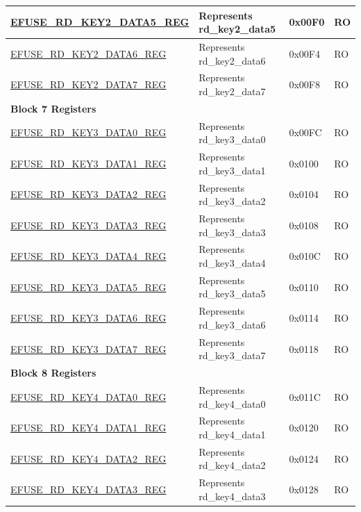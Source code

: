 \begin{longtable}{ | p{7cm} | p{6cm} | p{1.2cm} | p{1.5cm} | }
\hyperref[regdesc:EFUSERDKEY2DATANREG]{EFUSE\_RD\_KEY2\_DATA5\_REG} & Represents rd\_key2\_data5 & 0x00F0 & RO \\ \hline
\hyperref[regdesc:EFUSERDKEY2DATANREG]{EFUSE\_RD\_KEY2\_DATA6\_REG} & Represents rd\_key2\_data6 & 0x00F4 & RO \\ \hline
\hyperref[regdesc:EFUSERDKEY2DATANREG]{EFUSE\_RD\_KEY2\_DATA7\_REG} & Represents rd\_key2\_data7 & 0x00F8 & RO \\ \hline
\multicolumn{4}{|l|}{\textbf{Block 7 Registers}} \\ \hline
\hyperref[regdesc:EFUSERDKEY3DATANREG]{EFUSE\_RD\_KEY3\_DATA0\_REG} & Represents rd\_key3\_data0 & 0x00FC & RO \\ \hline
\hyperref[regdesc:EFUSERDKEY3DATANREG]{EFUSE\_RD\_KEY3\_DATA1\_REG} & Represents rd\_key3\_data1 & 0x0100 & RO \\ \hline
\hyperref[regdesc:EFUSERDKEY3DATANREG]{EFUSE\_RD\_KEY3\_DATA2\_REG} & Represents rd\_key3\_data2 & 0x0104 & RO \\ \hline
\hyperref[regdesc:EFUSERDKEY3DATANREG]{EFUSE\_RD\_KEY3\_DATA3\_REG} & Represents rd\_key3\_data3 & 0x0108 & RO \\ \hline
\hyperref[regdesc:EFUSERDKEY3DATANREG]{EFUSE\_RD\_KEY3\_DATA4\_REG} & Represents rd\_key3\_data4 & 0x010C & RO \\ \hline
\hyperref[regdesc:EFUSERDKEY3DATANREG]{EFUSE\_RD\_KEY3\_DATA5\_REG} & Represents rd\_key3\_data5 & 0x0110 & RO \\ \hline
\hyperref[regdesc:EFUSERDKEY3DATANREG]{EFUSE\_RD\_KEY3\_DATA6\_REG} & Represents rd\_key3\_data6 & 0x0114 & RO \\ \hline
\hyperref[regdesc:EFUSERDKEY3DATANREG]{EFUSE\_RD\_KEY3\_DATA7\_REG} & Represents rd\_key3\_data7 & 0x0118 & RO \\ \hline
\multicolumn{4}{|l|}{\textbf{Block 8 Registers}} \\ \hline
\hyperref[regdesc:EFUSERDKEY4DATANREG]{EFUSE\_RD\_KEY4\_DATA0\_REG} & Represents rd\_key4\_data0 & 0x011C & RO \\ \hline
\hyperref[regdesc:EFUSERDKEY4DATANREG]{EFUSE\_RD\_KEY4\_DATA1\_REG} & Represents rd\_key4\_data1 & 0x0120 & RO \\ \hline
\hyperref[regdesc:EFUSERDKEY4DATANREG]{EFUSE\_RD\_KEY4\_DATA2\_REG} & Represents rd\_key4\_data2 & 0x0124 & RO \\ \hline
\hyperref[regdesc:EFUSERDKEY4DATANREG]{EFUSE\_RD\_KEY4\_DATA3\_REG} & Represents rd\_key4\_data3 & 0x0128 & RO \\ \hline

\end{longtable}
